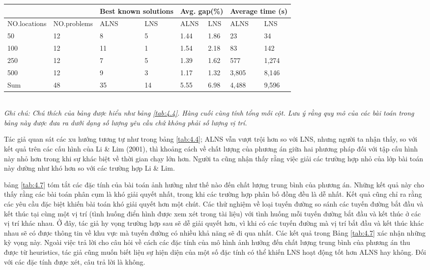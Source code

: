
\begin{table}[caption={Tóm tắt kết quả thu được từ các cấu hình mới}, label=tab:4.5]
    \begin{tabular}{@{}llllllll@{}}
        \toprule
                    &           & \multicolumn{2}{l}{\footnotesize{Best known solutions}}& \multicolumn{2}{l}{\footnotesize{Avg. gap(\%)}}& \multicolumn{2}{l}{\footnotesize{Average time (s)}} \\ 
        \hline            
        \footnotesize{NO.locations}&\scriptsize{NO.problems}&\footnotesize{ALNS}&\footnotesize{LNS}&\footnotesize{ALNS}&\footnotesize{LNS}&\footnotesize{ALNS}&\footnotesize{LNS} \\ \midrule
        50  &12 &8  &5 &1.44 &1.86 &23    &34  \\
        100 &12 &11 &1 &1.54 &2.18 &83    &142  \\
        250 &12 &7  &5 &1.39 &1.62 &577   &1,274 \\ 
        500 &12 &9  &3 &1.17 &1.32 &3,805 &8,146 \\     
        Sum &48 &35 &14&5.55 &6.98 &4,488 &9,596 \\     \bottomrule
        \end{tabular} \\
        \justify
        \textit{Ghi chú: Chú thích của bảng được hiểu như bảng \ref{tab:4.4}. Hàng cuối cùng tính tổng mỗi cột. Lưu ý rằng quy mô của các bài toán trong bảng này được đưa ra dưới dạng số lượng yêu cầu chứ không phải số lượng vị trí.}
\end{table}

Tác giả quan sát các xu hướng tương tự như trong bảng \ref{tab:4.4}; ALNS vẫn vượt trội hơn so với LNS, nhưng người ta nhận thấy, so với kết quả trên các cấu hình của Li \& Lim (2001), thì khoảng cách về chất lượng của phương án giữa hai phương pháp đối với tập cấu hình này nhỏ hơn trong khi sự khác biệt về thời gian chạy lớn hơn. Người ta cũng nhận thấy rằng việc giải các trường hợp nhỏ của lớp bài toán này dường như khó hơn so với các trường hợp Li \& Lim.

bảng \ref{tab:4.7} tóm tắt các đặc tính của bài toán ảnh hưởng như thế nào đến chất lượng trung bình của phương án. Những kết quả này cho thấy rằng các bài toán phân cụm là khó giải quyết nhất, trong khi các trường hợp phân bố đồng đều là dễ nhất. Kết quả cũng chỉ ra rằng các yêu cầu đặc biệt khiến bài toán khó giải quyết hơn một chút. Các thử nghiệm về loại tuyến đường so sánh các tuyến đường bắt đầu và kết thúc tại cùng một vị trí (tình huống điển hình được xem xét trong tài liệu) với tình huống mỗi tuyến đường bắt đầu và kết thúc ở các vị trí khác nhau. Ở đây, tác giả hy vọng trường hợp sau sẽ dễ giải quyết hơn, vì khi có các tuyến đường mà vị trí bắt đầu và kết thúc khác nhau sẽ có được thông tin về khu vực mà tuyến đường có nhiều khả năng sẽ đi qua nhất. Các kết quả trong Bảng \ref{tab:4.7} xác nhận những kỳ vọng này.
Ngoài việc trả lời cho câu hỏi về cách các đặc tính của mô hình ảnh hưởng đến chất lượng trung bình của phương án thu được từ heuristics, tác giả cũng muốn biết liệu sự hiện diện của một số đặc tính có thể khiến LNS hoạt động tốt hơn ALNS hay không. Đối với các đặc tính được xét, câu trả lời là không.

